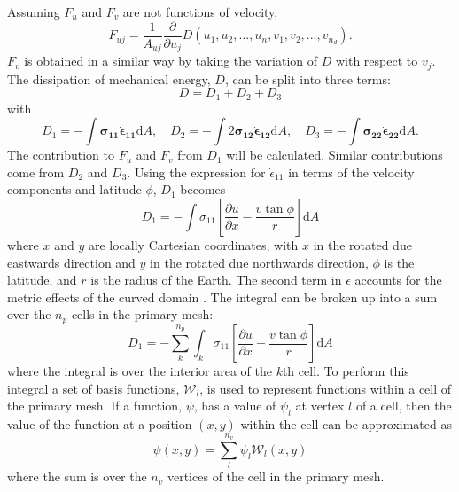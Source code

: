Assuming $F_u$ and $F_v$ are not functions of velocity,
\begin{equation}
F_{uj} =  \frac{1}{A_{uj}} \frac{\partial{}}{\partial{u_j}}D(u_1, u_2, ..., u_n, v_1, v_2, ..., v_{n_d}).
\label{eqn:variation}
\end{equation}
$F_v$ is obtained in a similar way by taking the variation of $D$ with respect to $v_j$. The dissipation of mechanical energy, $D$, can be split into three terms: 
\begin{equation}
D=D_1+ D_2+D_3
\end{equation}
with
\begin{equation}
D_1=-\int  \boldsymbol{\sigma_{11}} \boldsymbol{\dot{\epsilon}_{11}} \mathrm{d}A ,\quad D_2=-\int  2 \boldsymbol{\sigma_{12}} \boldsymbol{\dot{\epsilon}_{12}} \mathrm{d}A, \quad D_3=-\int  \boldsymbol{\sigma_{22}} \boldsymbol{\dot{\epsilon}_{22}} \mathrm{d}A.
\end{equation}
The contribution to $F_u$ and $F_v$ from $D_1$ will be calculated. Similar contributions come from $D_2$ and $D_3$. Using the expression for $\dot{\epsilon}_{11}$ in terms of the velocity components and latitude $\phi$, $D_1$ becomes
\begin{equation}
D_1=-\int  \sigma_{11} \left[ \frac{\partial{u}}{\partial{x}} - \frac{v \tan{\phi}}{r} \right] \mathrm{d}A
\end{equation}
where $x$ and $y$ are locally Cartesian coordinates, with $x$ in the rotated due eastwards direction and $y$ in the rotated due northwards direction, $\phi$ is the latitude, and $r$ is the radius of the Earth. The second term in $\dot{\epsilon}$ accounts for the metric effects of the curved domain \citep{Batchelor67}.
The integral can be broken up into a sum over the $n_p$ cells in the primary mesh:
\begin{equation}
D_1=- \sum_k^{n_p} \int_k  \sigma_{11} \left[ \frac{\partial{u}}{\partial{x}} - \frac{v \tan{\phi}}{r} \right] \mathrm{d}A
\label{eqn:d_1}
\end{equation}
where the integral is over the interior area of the $k$th cell. 
To perform this integral a set of basis functions, $\mathcal{W}_l$, is used to represent functions within a cell of the primary mesh. If a function, $\psi$, has a value of  $\psi_l$ at vertex $l$ of a cell, then the value of the function at a position $(x,y)$ within the cell can be approximated as
\begin{equation}
\psi(x,y) = \sum_l^{n_v} \psi_l \mathcal{W}_l (x,y)
\end{equation}
where the sum is over the $n_v$ vertices of the cell in the primary mesh.
